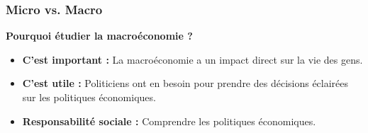 \documentclass{beamer}
\begin{document}
\begin{frame}
    \frametitle{Micro vs. Macro}
    \textbf{Pourquoi étudier la macroéconomie ?}
    \begin{itemize}\pause
        \item \textbf{C'est important :} 
        La macroéconomie a un impact direct sur la vie des gens.\pause
        \item \textbf{C'est utile :} Politiciens ont en besoin pour 
        prendre des décisions éclairées sur les politiques économiques.\pause
        \item \textbf{Responsabilité sociale :} Comprendre les politiques économiques.
    \end{itemize}
    \end{frame}
    
    

\end{document}
